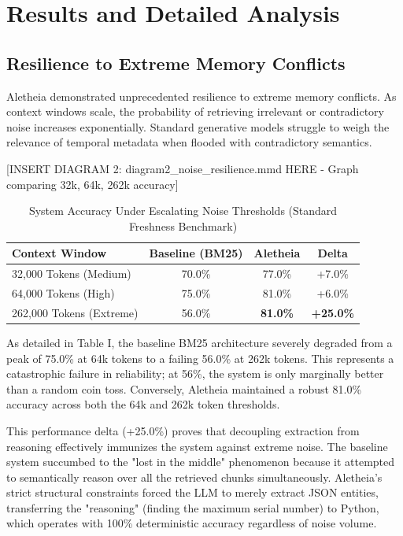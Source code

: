 \documentclass[journal,10pt]{IEEEtran}
\begin{document}
\section{Results and Detailed Analysis}

\subsection{Resilience to Extreme Memory Conflicts}
Aletheia demonstrated unprecedented resilience to extreme memory conflicts. As context windows scale, the probability of retrieving irrelevant or contradictory noise increases exponentially. Standard generative models struggle to weigh the relevance of temporal metadata when flooded with contradictory semantics.

[INSERT DIAGRAM 2: diagram2\_noise_resilience.mmd HERE - Graph comparing 32k, 64k, 262k accuracy]

\begin{table}[htbp]
\caption{System Accuracy Under Escalating Noise Thresholds (Standard Freshness Benchmark)}
\begin{center}
\begin{tabular}{|l|c|c|c|}
\hline
\textbf{Context Window} & \textbf{Baseline (BM25)} & \textbf{Aletheia} & \textbf{Delta} \\
\hline
32,000 Tokens (Medium) & 70.0\% & 77.0\% & +7.0\% \\
64,000 Tokens (High) & 75.0\% & 81.0\% & +6.0\% \\
262,000 Tokens (Extreme) & 56.0\% & \textbf{81.0\%} & \textbf{+25.0\%} \\
\hline
\end{tabular}
\label{tab1}
\end{center}
\end{table}

As detailed in Table I, the baseline BM25 architecture severely degraded from a peak of 75.0\% at 64k tokens to a failing 56.0\% at 262k tokens. This represents a catastrophic failure in reliability; at 56\%, the system is only marginally better than a random coin toss. Conversely, Aletheia maintained a robust 81.0\% accuracy across both the 64k and 262k token thresholds. 

This performance delta (+25.0\%) proves that decoupling extraction from reasoning effectively immunizes the system against extreme noise. The baseline system succumbed to the "lost in the middle" phenomenon because it attempted to semantically reason over all the retrieved chunks simultaneously. Aletheia's strict structural constraints forced the LLM to merely extract JSON entities, transferring the "reasoning" (finding the maximum serial number) to Python, which operates with 100\% deterministic accuracy regardless of noise volume.
\end{document}
